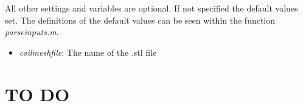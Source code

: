 \documentclass[a4paper,12pt]{book}
\begin{document}
All other settings and variables are optional. If not specified the default values set. The definitions of the default values can be seen within the function \textit{parse\textunderscore inputs.m}.


\begin{itemize}
	\item  \textit{coil\textunderscore mesh\textunderscore file}: The name of the .stl file 
\end{itemize}


\section{TO DO}



%
%

\end{document}
